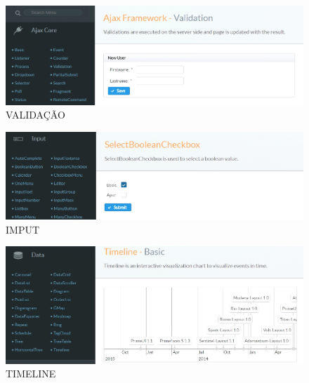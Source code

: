 \documentclass[12pt,a4paper]{article}
\begin{document}
\noindent \begin{figure}[h] \label{Figura:PrymeFaces} \caption{VALIDAÇÃO} \centering \includegraphics[width=17cm]{recursos/imagens/img03.png}\end{figure}

\noindent \begin{figure}[h] \label{Figura:PrymeFaces} \caption{IMPUT} \centering \includegraphics[width=17cm]{recursos/imagens/img04.png}\end{figure}

\noindent \begin{figure}[h] \label{Figura:PrymeFaces} \caption{TIMELINE} \centering \includegraphics[width=17cm]{recursos/imagens/img05.png}\end{figure}

\vspace{-5cm}
\end{document}
